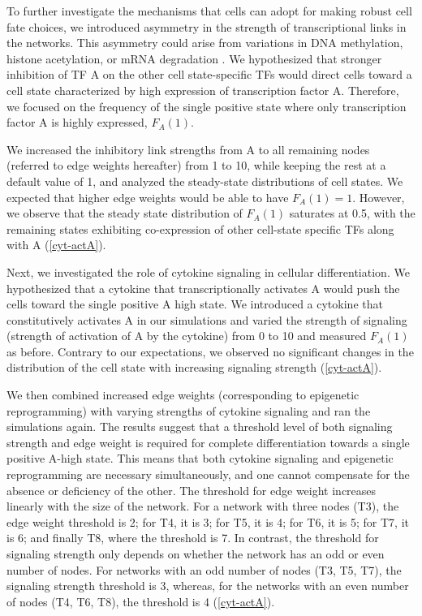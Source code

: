 \documentclass[11pt,a4paper]{article}
\theoremstyle{definition}
\theoremstyle{remark}
\begin{document}
To further investigate the mechanisms that cells can adopt for making robust cell fate choices, we introduced asymmetry in the strength of transcriptional links in the networks. This asymmetry could arise from variations in DNA methylation, histone acetylation, or mRNA degradation \parencite{duddu_emergent_2022}. We hypothesized that stronger inhibition of TF A on the other cell state-specific TFs would direct cells toward a cell state characterized by high expression of transcription factor A. Therefore, we focused on the frequency of the single positive state where only transcription factor A is highly expressed, $F_A(1)$. 

We increased the inhibitory link strengths from A to all remaining nodes (referred to edge weights hereafter) from 1 to 10, while keeping the rest at a default value of 1, and analyzed the steady-state distributions of cell states. We expected that higher edge weights would be able to have $F_A(1) = 1$. However, we observe that the steady state distribution of $F_A(1)$ saturates at 0.5, with the remaining states exhibiting co-expression of other cell-state specific TFs along with A (\cref{cyt-actA}).

Next, we investigated the role of cytokine signaling in cellular differentiation. We hypothesized that a cytokine that transcriptionally activates A would push the cells toward the single positive A high state. We introduced a cytokine that constitutively activates A in our simulations and varied the strength of signaling (strength of activation of A by the cytokine) from 0 to 10 and measured $F_A(1)$ as before. Contrary to our expectations, we observed no significant changes in the distribution of the cell state with increasing signaling strength (\cref{cyt-actA}).

We then combined increased edge weights (corresponding to epigenetic reprogramming) with varying strengths of cytokine signaling and ran the simulations again. The results suggest that a threshold level of both signaling strength and edge weight is required for complete differentiation towards a single positive A-high state. This means that both cytokine signaling and epigenetic reprogramming are necessary simultaneously, and one cannot compensate for the absence or deficiency of the other. The threshold for edge weight increases linearly with the size of the network. For a network with three nodes (T3), the edge weight threshold is 2; for T4, it is 3; for T5, it is 4; for T6, it is 5; for T7, it is 6; and finally T8, where the threshold is 7. In contrast, the threshold for signaling strength only depends on whether the network has an odd or even number of nodes. For networks with an odd number of nodes (T3, T5, T7), the signaling strength threshold is 3, whereas, for the networks with an even number of nodes (T4, T6, T8), the threshold is 4 (\cref{cyt-actA}).
\end{document}
